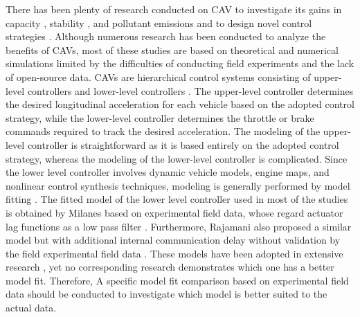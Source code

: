 \documentclass[journal]{IEEEtran}
\begin{document}
There has been plenty of research conducted on CAV to investigate its gains in capacity \citep{Zhao2020,Gong2018a}, stability \citep{Zhou2019c,Talebpour2017a}, and pollutant emissions \citep{Wang2022,Silgu2020} and to design novel control strategies \citep{Flores2018a,Wang2019a}. Although numerous research has been conducted to analyze the benefits of CAVs, most of these studies are based on theoretical and numerical simulations limited by the difficulties of conducting field experiments and the lack of open-source data. CAVs are hierarchical control systems consisting of upper-level controllers and lower-level controllers \citep{Wang2018e}. The upper-level controller determines the desired longitudinal acceleration for each vehicle based on the adopted control strategy, while the lower-level controller determines the throttle or brake commands required to track the desired acceleration. The modeling of the upper-level controller is straightforward as it is based entirely on the adopted control strategy, whereas the modeling of the lower-level controller is complicated. Since the lower level controller involves dynamic vehicle models, engine maps, and nonlinear control synthesis techniques, modeling is generally performed by model fitting \citep{Zheng2014a,Zheng2015a}. The fitted model of the lower level controller used in most of the studies is obtained by Milanes based on experimental field data, whose regard actuator lag functions as a low pass filter \citep{milanes2014modeling}. Furthermore, Rajamani also proposed a similar model but with additional internal communication delay without validation by the field experimental field data \citep{rajamani2011vehicle}. These models have been adopted in extensive research \citep{Navas2019a,Lai2020}, yet no corresponding research demonstrates which one has a better model fit. Therefore, A specific model fit comparison based on experimental field data should be conducted to investigate which model is better suited to the actual data.
\end{document}
